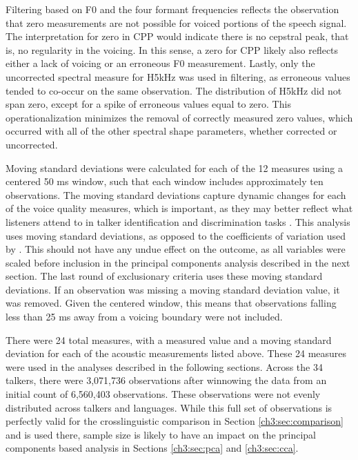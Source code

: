 Filtering based on F0 and the four formant frequencies reflects the observation that zero measurements are not possible for voiced portions of the speech signal. The interpretation for zero in CPP would indicate there is no cepstral peak, that is, no regularity in the voicing. In this sense, a zero for CPP likely also reflects either a lack of voicing or an erroneous F0 measurement. Lastly, only the uncorrected spectral measure for H5kHz was used in filtering, as erroneous values tended to co-occur on the same observation. The distribution of H5kHz did not span zero, except for a spike of erroneous values equal to zero. This operationalization minimizes the removal of correctly measured zero values, which occurred with all of the other spectral shape parameters, whether corrected or uncorrected. 

Moving standard deviations were calculated for each of the 12 measures using a centered 50 ms window, such that each window includes approximately ten observations. The moving standard deviations capture dynamic changes for each of the voice quality measures, which is important, as they may better reflect what listeners attend to in talker identification and discrimination tasks \citep{lee_2019_acoustic}. This analysis uses moving standard deviations, as opposed to the coefficients of variation used by \citet{lee_2019_acoustic}. This should not have any undue effect on the outcome, as all variables were scaled before inclusion in the principal components analysis described in the next section. The last round of exclusionary criteria uses these moving standard deviations. If an observation was missing a moving standard deviation value, it was removed. Given the centered window, this means that observations falling less than 25 ms away from a voicing boundary were not included. 

There were 24 total measures, with a measured value and a moving standard deviation for each of the acoustic measurements listed above. These 24 measures were used in the analyses described in the following sections. Across the 34 talkers, there were 3,071,736 observations after winnowing the data from an initial count of 6,560,403 observations. These observations were not evenly distributed across talkers and languages. While this full set of observations is perfectly valid for the crosslinguistic comparison in Section \ref{ch3:sec:comparison} and is used there, sample size is likely to have an impact on the principal components based analysis in Sections \ref{ch3:sec:pca} and \ref{ch3:sec:cca}. 

